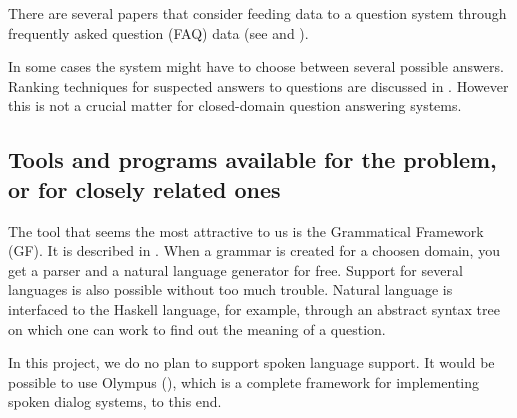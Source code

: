 \documentclass[a4paper,11pt]{article}
\begin{document}
There are several papers that consider feeding data to a question system through
frequently asked question (FAQ) data (see \cite{evaluatingqasusingfaq} and
\cite{faqfindersys}).

In some cases the system might have to choose between several possible answers.
Ranking techniques for suspected answers to questions are discussed in
\cite{rankingsuspected}. However this is not a crucial matter for closed-domain
question answering systems.

\subsection{Tools and programs available for the problem, or for closely related ones}
The tool that seems the most attractive to us is the Grammatical Framework (GF). It
is described in \cite{ranta-2011}. When a grammar is created for a choosen domain,
you get a parser and a natural language generator for free. Support for several
languages is also possible without too much trouble. Natural language is interfaced to the
Haskell language, for example, through an abstract syntax tree on which one can work
to find out the meaning of a question.

In this project, we do no plan to support spoken language support. It would be
possible to use Olympus (\cite{olympus}), which is a complete framework for
implementing spoken dialog systems, to this end.




\end{document}
